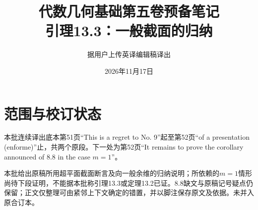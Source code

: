 \documentclass[openany,fontset=fandol]{ctexbook}
\begin{document}
\title{代数几何基础第五卷预备笔记\\引理13.3：一般截面的归纳}
\author{据用户上传英译编辑稿译出}
\date{2026年11月17日}
\maketitle
\chapter*{范围与校订状态}
本批连续译出底本第51页“This is a regret to No. 9”起至第52页“of a presentation (enforme)”止，共两个原段。下一处为第52页“It remains to prove the corollary announced of 8.8 in the case $m=1$”。

本批给出原稿所用超平面截面断言及向一般余维的归纳说明；所依赖的$m=1$情形尚待下段证明，不能据本批称引理13.3或定理13.2已证。8.8缺文与原稿记号疑点仍保留；正文仅整理可由紧邻上下文确定的错置，并以脚注保存原文及依据。未并入原合订本。
\end{document}
